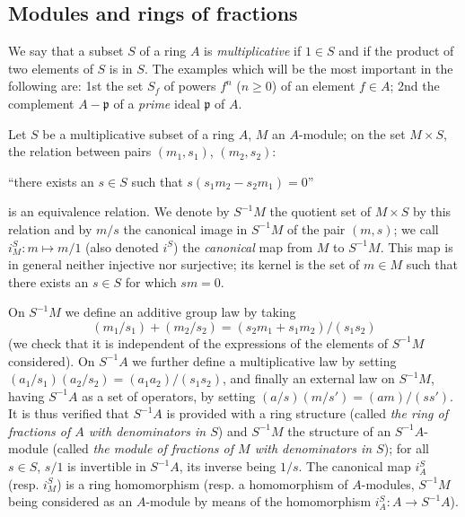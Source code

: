 \subsection{Modules and rings of fractions}
\label{subsection-modules-and-rings-of-fractions}

\begin{env}[1.2.1]
\label{0.1.2.1}
We say that a subset $S$ of a ring $A$ is {\em multiplicative} if $1\in S$ and
if the product of two elements of $S$ is in $S$. The examples which will be the
most important in the following are: 1st the set $S_f$ of
powers $f^n$ ($n\geqslant 0$) of an element $f\in A$; 2nd the
complement $A-\mathfrak{p}$ of a {\em prime} ideal $\mathfrak{p}$ of $A$.
\end{env}

\begin{env}[1.2.2]
\label{0.1.2.2}
Let $S$ be a multiplicative subset of a ring $A$, $M$ an $A$-module; on the set
$M\times S$, the relation between pairs $(m_1,s_1)$, $(m_2,s_2)$:
\begin{center}
  ``there exists an $s\in S$ such that $s(s_1 m_2-s_2 m_1)=0$''
\end{center}
is an equivalence relation. We denote by $S^{-1}M$ the quotient set of
$M\times S$ by this relation and by $m/s$ the canonical image in $S^{-1}M$ of
the pair $(m,s)$; we call $i_M^S:m\mapsto m/1$ (also denoted $i^S$) the
{\em canonical} map from $M$ to $S^{-1}M$. This map is in general neither
injective nor surjective; its kernel is the set of $m\in M$ such that there
exists an $s\in S$ for which $sm=0$.

On $S^{-1}M$ we define an additive group law by taking
\[
  (m_1/s_1)+(m_2/s_2)=(s_2 m_1+s_1 m_2)/(s_1 s_2)
\]
(we check that it is independent of the expressions of the elements of $S^{-1}M$
considered). On $S^{-1}A$ we further define a multiplicative law by setting
$(a_1/s_1)(a_2/s_2)=(a_1 a_2)/(s_1 s_2)$, and finally an external law on
$S^{-1}M$, having $S^{-1}A$ as a set of operators, by setting
$(a/s)(m/s')=(am)/(ss')$. It is thus verified that $S^{-1}A$ is provided with a
ring structure (called {\em the ring of fractions of $A$ with denominators in
$S$}) and $S^{-1}M$ the structure of an $S^{-1}A$-module (called {\em the
module of fractions of $M$ with denominators in $S$}); for all $s\in S$, $s/1$
is invertible in $S^{-1}A$, its inverse being $1/s$. The canonical map $i_A^S$
(resp. $i_M^S$) is a ring homomorphism (resp. a homomorphism of $A$-modules,
$S^{-1}M$ being considered as an $A$-module by means of the homomorphism
$i_A^S:A\to S^{-1}A$).
\end{env}

